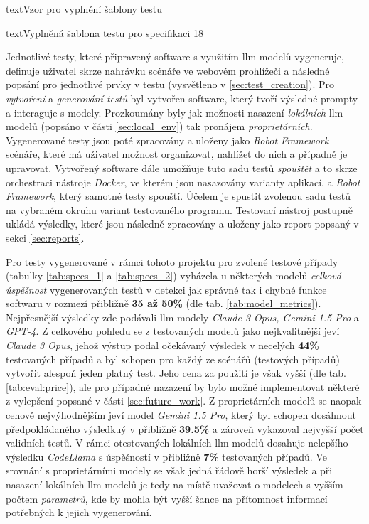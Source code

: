 \documentclass[czech, ma, kiv, he, iso690numb, pdf, viewonly]{fasthesis}
\begin{document}
\begin{code}{text}{Vzor pro vyplnění šablony testu \label{lst:template}}
{\begin{code}{text}{Vyplněná šablona testu pro specifikaci 18 \label{lst:spec18}}
{    Jednotlivé testy, které připravený software s využitím \Gls{llm} modelů vygeneruje, definuje uživatel skrze nahrávku scénáře ve webovém prohlížeči a následné popsání  pro jednotlivé prvky v testu (vysvětleno v \ref{sec:test_creation}). Pro \textit{vytvoření} a \textit{generování testů} byl vytvořen software, který tvoří výsledné prompty a interaguje s modely. Prozkoumány byly jak možnosti nasazení \textit{lokálních} \Gls{llm} modelů (popsáno v části \ref{sec:local_env}) tak pronájem \textit{proprietárních}. Vygenerované testy jsou poté zpracovány a uloženy jako \textit{Robot Framework} scénáře, které má uživatel možnost organizovat, nahlížet do nich a případně je upravovat. Vytvořený software dále umožňuje tuto sadu testů \textit{spouštět} a to skrze orchestraci nástroje \textit{Docker}, ve kterém jsou nasazovány varianty aplikací, a \textit{Robot Framework}, který samotné testy spouští. Účelem je spustit zvolenou sadu testů na vybraném okruhu variant testovaného programu. Testovací nástroj postupně ukládá výsledky, které jsou následně zpracovány a uloženy jako report popsaný v sekci \ref{sec:reports}.

    Pro testy vygenerované v rámci tohoto projektu pro zvolené testové případy (tabulky \ref{tab:specs_1} a \ref{tab:specs_2}) vyházela u některých modelů \textit{celková úspěšnost} vygenerovaných testů v detekci jak správné tak i chybné funkce softwaru v rozmezí přibližně \textbf{35 až 50\%} (dle tab. \ref{tab:model_metrics}). Nejpřesnější výsledky zde podávali \Gls{llm} modely \textit{Claude 3 Opus, Gemini 1.5 Pro} a \textit{GPT-4}. Z celkového pohledu se z testovaných modelů jako nejkvalitnější jeví \textit{Claude 3 Opus}, jehož výstup podal očekávaný výsledek v necelých \textbf{44\%} testovaných případů a byl schopen pro každý ze scénářů (testových případů) vytvořit alespoň jeden platný test. Jeho cena za použití je však vyšší (dle tab. \ref{tab:eval:price}), ale pro případné nazazení by bylo možné implementovat některé z vylepšení popsané v části \ref{sec:future_work}. Z proprietárních modelů se naopak cenově nejvýhodnějším jeví model \textit{Gemini 1.5 Pro}, který byl schopen dosáhnout předpokládaného výsledkuý v přibližně \textbf{39.5\%} a zároveň vykazoval nejvyšší počet validních testů. V rámci otestovaných lokálních \Gls{llm} modelů dosahuje nelepšího výsledku \textit{CodeLlama} s úspěšností v přibližně \textbf{7\%} testovaných případů. Ve srovnání s proprietárními modely se však jedná řádově horší výsledek a při nasazení lokálních \Gls{llm} modelů je tedy na místě uvažovat o modelech s vyšším počtem \textit{parametrů}, kde by mohla být vyšší šance na přítomnost informací potřebných k jejich vygenerování.

}
\end{code}}
\end{code}
\end{document}
